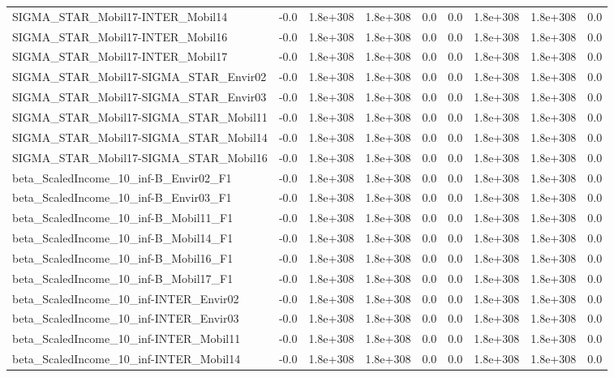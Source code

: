 \begin{tabular}{lrrrrrrrr}
SIGMA_STAR_Mobil17-INTER_Mobil14 & -0.0 & 1.8e+308 & 1.8e+308 & 0.0 & 0.0 & 1.8e+308 & 1.8e+308 & 0.0 \\
SIGMA_STAR_Mobil17-INTER_Mobil16 & -0.0 & 1.8e+308 & 1.8e+308 & 0.0 & 0.0 & 1.8e+308 & 1.8e+308 & 0.0 \\
SIGMA_STAR_Mobil17-INTER_Mobil17 & -0.0 & 1.8e+308 & 1.8e+308 & 0.0 & 0.0 & 1.8e+308 & 1.8e+308 & 0.0 \\
SIGMA_STAR_Mobil17-SIGMA_STAR_Envir02 & -0.0 & 1.8e+308 & 1.8e+308 & 0.0 & 0.0 & 1.8e+308 & 1.8e+308 & 0.0 \\
SIGMA_STAR_Mobil17-SIGMA_STAR_Envir03 & -0.0 & 1.8e+308 & 1.8e+308 & 0.0 & 0.0 & 1.8e+308 & 1.8e+308 & 0.0 \\
SIGMA_STAR_Mobil17-SIGMA_STAR_Mobil11 & -0.0 & 1.8e+308 & 1.8e+308 & 0.0 & 0.0 & 1.8e+308 & 1.8e+308 & 0.0 \\
SIGMA_STAR_Mobil17-SIGMA_STAR_Mobil14 & -0.0 & 1.8e+308 & 1.8e+308 & 0.0 & 0.0 & 1.8e+308 & 1.8e+308 & 0.0 \\
SIGMA_STAR_Mobil17-SIGMA_STAR_Mobil16 & -0.0 & 1.8e+308 & 1.8e+308 & 0.0 & 0.0 & 1.8e+308 & 1.8e+308 & 0.0 \\
beta_ScaledIncome_10_inf-B_Envir02_F1 & -0.0 & 1.8e+308 & 1.8e+308 & 0.0 & 0.0 & 1.8e+308 & 1.8e+308 & 0.0 \\
beta_ScaledIncome_10_inf-B_Envir03_F1 & -0.0 & 1.8e+308 & 1.8e+308 & 0.0 & 0.0 & 1.8e+308 & 1.8e+308 & 0.0 \\
beta_ScaledIncome_10_inf-B_Mobil11_F1 & -0.0 & 1.8e+308 & 1.8e+308 & 0.0 & 0.0 & 1.8e+308 & 1.8e+308 & 0.0 \\
beta_ScaledIncome_10_inf-B_Mobil14_F1 & -0.0 & 1.8e+308 & 1.8e+308 & 0.0 & 0.0 & 1.8e+308 & 1.8e+308 & 0.0 \\
beta_ScaledIncome_10_inf-B_Mobil16_F1 & -0.0 & 1.8e+308 & 1.8e+308 & 0.0 & 0.0 & 1.8e+308 & 1.8e+308 & 0.0 \\
beta_ScaledIncome_10_inf-B_Mobil17_F1 & -0.0 & 1.8e+308 & 1.8e+308 & 0.0 & 0.0 & 1.8e+308 & 1.8e+308 & 0.0 \\
beta_ScaledIncome_10_inf-INTER_Envir02 & -0.0 & 1.8e+308 & 1.8e+308 & 0.0 & 0.0 & 1.8e+308 & 1.8e+308 & 0.0 \\
beta_ScaledIncome_10_inf-INTER_Envir03 & -0.0 & 1.8e+308 & 1.8e+308 & 0.0 & 0.0 & 1.8e+308 & 1.8e+308 & 0.0 \\
beta_ScaledIncome_10_inf-INTER_Mobil11 & -0.0 & 1.8e+308 & 1.8e+308 & 0.0 & 0.0 & 1.8e+308 & 1.8e+308 & 0.0 \\
beta_ScaledIncome_10_inf-INTER_Mobil14 & -0.0 & 1.8e+308 & 1.8e+308 & 0.0 & 0.0 & 1.8e+308 & 1.8e+308 & 0.0 \\

\end{tabular}
